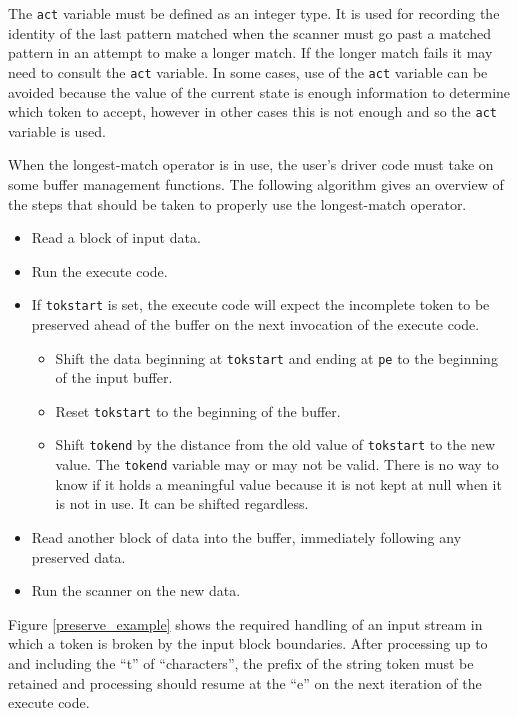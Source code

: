 \documentclass[letterpaper,11pt,oneside]{book}
\begin{document}
The \verb|act| variable must be defined as an integer type. It is used for
recording the identity of the last pattern matched when the scanner must go
past a matched pattern in an attempt to make a longer match. If the longer
match fails it may need to consult the \verb|act| variable. In some cases, use 
of the \verb|act|
variable can be avoided because the value of the current state is enough
information to determine which token to accept, however in other cases this is
not enough and so the \verb|act| variable is used. 

When the longest-match operator is in use, the user's driver code must take on
some buffer management functions. The following algorithm gives an overview of
the steps that should be taken to properly use the longest-match operator.

\begin{itemize}
\setlength{\parskip}{0pt}
\item Read a block of input data.
\item Run the execute code.
\item If \verb|tokstart| is set, the execute code will expect the incomplete
token to be preserved ahead of the buffer on the next invocation of the execute
code.  
\begin{itemize}
\item Shift the data beginning at \verb|tokstart| and ending at \verb|pe| to the
beginning of the input buffer.
\item Reset \verb|tokstart| to the beginning of the buffer. 
\item Shift \verb|tokend| by the distance from the old value of \verb|tokstart|
to the new value. The \verb|tokend| variable may or may not be valid.  There is
no way to know if it holds a meaningful value because it is not kept at null
when it is not in use. It can be shifted regardless.
\end{itemize}
\item Read another block of data into the buffer, immediately following any
preserved data.
\item Run the scanner on the new data.
\end{itemize}

Figure \ref{preserve_example} shows the required handling of an input stream in
which a token is broken by the input block boundaries. After processing up to
and including the ``t'' of ``characters'', the prefix of the string token must be
retained and processing should resume at the ``e'' on the next iteration of
the execute code.
\end{document}
